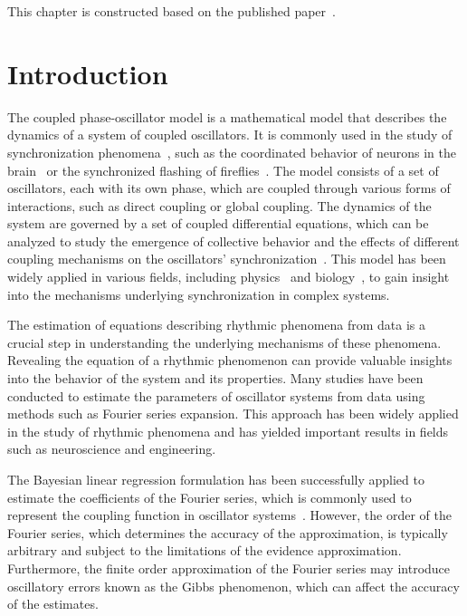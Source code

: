 This chapter is constructed based on the published paper~\cite{yoneda2022}.

\section{Introduction}

The coupled phase-oscillator model is a mathematical model that describes the dynamics of a system of coupled oscillators. It is commonly used in the study of synchronization phenomena~\cite{strogatz2003}, such as the coordinated behavior of neurons in the brain~\cite{cossart2003,winfree1967,Lu2016} or the synchronized flashing of fireflies~\cite{smith1935,buck1968}. The model consists of a set of oscillators, each with its own phase, which are coupled through various forms of interactions, such as direct coupling or global coupling. The dynamics of the system are governed by a set of coupled differential equations, which can be analyzed to study the emergence of collective behavior and the effects of different coupling mechanisms on the oscillators' synchronization~\cite{kori2011}. This model has been widely applied in various fields, including physics~\cite{wang1988} and biology~\cite{Lu2016}, to gain insight into the mechanisms underlying synchronization in complex systems.

The estimation of equations describing rhythmic phenomena from data is a crucial step in understanding the underlying mechanisms of these phenomena. Revealing the equation of a rhythmic phenomenon can provide valuable insights into the behavior of the system and its properties. Many studies have been conducted to estimate the parameters of oscillator systems from data using methods such as Fourier series expansion. This approach has been widely applied in the study of rhythmic phenomena and has yielded important results in fields such as neuroscience and engineering.

The Bayesian linear regression formulation has been successfully applied to estimate the coefficients of the Fourier series, which is commonly used to represent the coupling function in oscillator systems~\cite{ota2014}. However, the order of the Fourier series, which determines the accuracy of the approximation, is typically arbitrary and subject to the limitations of the evidence approximation. Furthermore, the finite order approximation of the Fourier series may introduce oscillatory errors known as the Gibbs phenomenon, which can affect the accuracy of the estimates. 

